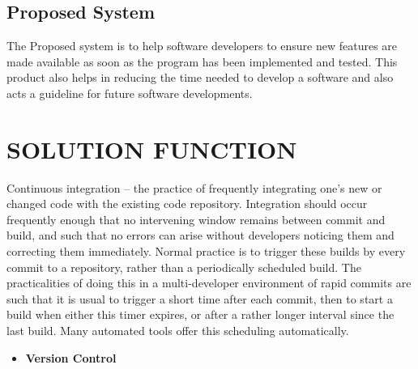 \documentclass[12pt,a4paper,oneside]{report}
\begin{document}
{\subsection{Proposed System}
\par 
The Proposed system is to help software developers to ensure new features are made
available as soon as the program has been implemented and tested. This product also helps in
reducing the time needed to develop a software and also acts a guideline for future software
developments.
\section{SOLUTION FUNCTION}

\par Continuous integration – the practice of frequently integrating one's new or changed code with the existing code repository. Integration should occur frequently enough that no intervening window remains between commit and build, and such that no errors can arise without developers noticing them and correcting them immediately. Normal practice is to trigger these builds by every commit to a repository, rather than a periodically scheduled build. The practicalities of doing this in a multi-developer environment of rapid commits are such that it is usual to trigger a short time after each commit, then to start a build when either this timer expires, or after a rather longer interval since the last build. Many automated tools offer this scheduling automatically.

\begin{itemize}
\item \textbf{Version Control}


\end{itemize}}
\end{document}
